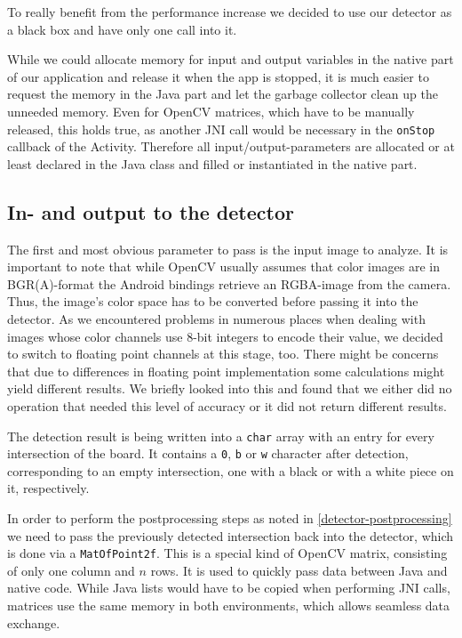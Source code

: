 	To really benefit from the performance increase we decided to use our detector as a black box and have only one call into it.

	While we could allocate memory for input and output variables in the native part of our application and release it when the app is stopped, it is much easier to request the memory in the Java part and let the garbage collector clean up the unneeded memory. Even for OpenCV matrices, which have to be manually released, this holds true, as another JNI call would be necessary in the \texttt{onStop} callback of the Activity. Therefore all input/output-parameters are allocated or at least declared in the Java class and filled or instantiated in the native part.

	\subsection{In- and output to the detector}
	\label{android-detector-inoutput}
	The first and most obvious parameter to pass is the input image to analyze. It is important to note that while OpenCV usually assumes that color images are in BGR(A)-format the Android bindings retrieve an RGBA-image from the camera. Thus, the image's color space has to be converted before passing it into the detector. As we encountered problems in numerous places when dealing with images whose color channels use 8-bit integers to encode their value, we decided to switch to floating point channels at this stage, too. There might be concerns that due to differences in floating point implementation some calculations might yield different results. We briefly looked into this and found that we either did no operation that needed this level of accuracy or it did not return different results.

	The detection result is being written into a \texttt{char} array with an entry for every intersection of the board. It contains a \texttt{0}, \texttt{b} or \texttt{w} character after detection, corresponding to an empty intersection, one with a black or with a white piece on it, respectively.

	In order to perform the postprocessing steps as noted in \autoref{detector-postprocessing} we need to pass the previously detected intersection back into the detector, which is done via a \texttt{MatOfPoint2f}. This is a special kind of OpenCV matrix, consisting of only one column and $n$ rows. It is used to quickly pass data between Java and native code. While Java lists would have to be copied when performing JNI calls, matrices use the same memory in both environments, which allows seamless data exchange.

